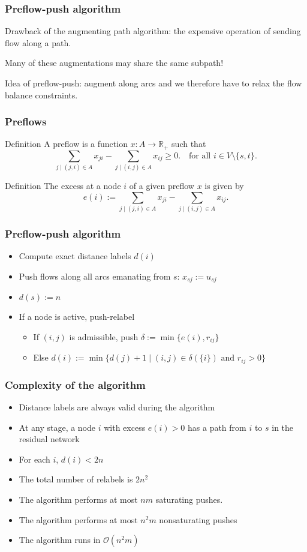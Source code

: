 \documentclass[9pt]{beamer}
\begin{document}
\begin{frame}
\frametitle{Preflow-push algorithm}
Drawback of the augmenting path algorithm: the expensive operation
of \alert{sending flow} along a path.\bigskip

Many of these augmentations may share \alert{the same subpath}!\bigskip

Idea of preflow-push: augment along \alert{arcs} and
we therefore have to \alert{relax} the \alert{flow balance constraints}.
\end{frame}
\begin{frame}
\frametitle{Preflows}
\begin{block}{Definition}
A \alert{preflow} is a function $x:A\rightarrow \mathbb R_+$ such that
$$\sum_{j\mid (j,i)\in A} x_{ji} -\sum_{j\mid (i,j)\in A} x_{ij} \geq 0.
\quad \text{for all } i\in V\setminus \{s,t\}.$$
\end{block}
\begin{block}{Definition}
The \alert{excess} at a node $i$ of a given preflow $x$ is given by 
$$e(i):=\sum_{j\mid (j,i)\in A} x_{ji} -\sum_{j\mid (i,j)\in A} x_{ij}.$$
\end{block}
\end{frame}
\begin{frame}
\frametitle{Preflow-push algorithm}
\begin{itemize}
\item Compute exact \alert{distance labels} $d(i)$\bigskip
\item Push flows along all arcs emanating from $s$: $x_{sj}:=u_{sj}$\bigskip
\item $d(s):=n$\bigskip
\item If a node is active, \alert{push-relabel}\medskip
\begin{itemize}
\item If $(i,j)$ is admissible, push $\delta:=\min\{e(i),r_{ij}\}$\medskip
\item Else $d(i):=\min\{d(j)+1\mid (i,j)\in \delta(\{i\})\text{ and }r_{ij}>0\}$
\end{itemize}
\end{itemize}
\end{frame}
\begin{frame}
\frametitle{Complexity of the algorithm}
\begin{itemize}
\item Distance labels are always \alert{valid} during the algorithm\medskip
\item At any stage, a node $i$ with excess $e(i)>0$ has a path from $i$ to $s$ in the residual network\medskip
\item For each $i$, \alert{$d(i)<2n$}\medskip
\item The total number of \alert{relabels} is $2n^2$\medskip
\item The algorithm performs at most $nm$ \alert{saturating} pushes.\medskip
\item The algorithm performs at most $n^2m$ \alert{nonsaturating} pushes\bigskip
\item The algorithm runs in $\mathcal O(n^2m)$
\end{itemize}
\end{frame}
\end{document}

